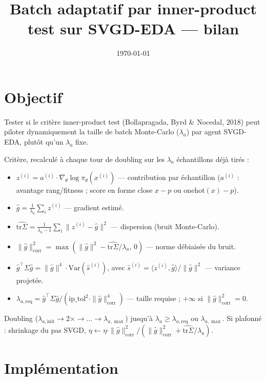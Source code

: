 \documentclass{article}
\title{Batch adaptatif par inner-product test sur SVGD-EDA — bilan}
\author{}
\date{\today}
\begin{document}
\maketitle

\section{Objectif}

Tester si le critère inner-product test (Bollapragada, Byrd \& Nocedal, 2018) peut piloter
dynamiquement la taille de batch Monte-Carlo ($\lambda_a$) par agent SVGD-EDA, plutôt qu'un
$\lambda_a$ fixe.

Critère, recalculé à chaque tour de doubling sur les $\lambda_a$ échantillons déjà tirés :

\begin{itemize}
  \item $z^{(i)} = a^{(i)} \cdot \nabla_\theta \log \pi_\theta(x^{(i)})$ — contribution par
    échantillon ($a^{(i)}$ : avantage rang/fitness ; score en forme close $x-p$ ou
    $\mathrm{onehot}(x)-p$).
  \item $\hat g = \frac{1}{\lambda_a}\sum_i z^{(i)}$ — gradient estimé.
  \item $\widehat{\mathrm{tr}\Sigma} = \frac{1}{\lambda_a-1}\sum_i \|z^{(i)}-\hat g\|^2$ —
    dispersion (bruit Monte-Carlo).
  \item $\|\hat g\|^2_{\mathrm{corr}} = \max(\|\hat g\|^2 - \widehat{\mathrm{tr}\Sigma}/\lambda_a,\,0)$
    — norme débiaisée du bruit.
  \item $\hat g^\top \Sigma \hat g = \|\hat g\|^4 \cdot \mathrm{Var}(\hat s^{(i)})$, avec
    $\hat s^{(i)} = \langle z^{(i)}, \hat g\rangle/\|\hat g\|^2$ — variance projetée.
  \item $\lambda_{a,\mathrm{req}} = \hat g^\top \Sigma \hat g / (\mathrm{ip\_tol}^2 \cdot
    \|\hat g\|^4_{\mathrm{corr}})$ — taille requise ; $+\infty$ si $\|\hat g\|^2_{\mathrm{corr}}=0$.
\end{itemize}

Doubling ($\lambda_{a,\mathrm{init}} \to 2\times \to \dots \to \lambda_{a,\max}$) jusqu'à
$\lambda_a \geq \lambda_{a,\mathrm{req}}$ ou $\lambda_{a,\max}$. Si plafonné : shrinkage du pas
SVGD, $\eta \leftarrow \eta \cdot \|\hat g\|^2_{\mathrm{corr}} /
(\|\hat g\|^2_{\mathrm{corr}} + \widehat{\mathrm{tr}\Sigma}/\lambda_a)$.

\section{Implémentation}
\end{document}
